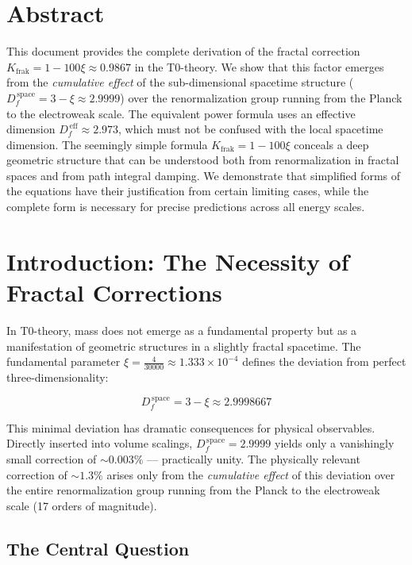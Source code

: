 \section*{Abstract}
		This document provides the complete derivation of the fractal correction $K_{\text{frak}} = 1 - 100\xi \approx 0.9867$ in the T0-theory. We show that this factor emerges from the \emph{cumulative effect} of the sub-dimensional spacetime structure ($D_f^{\,\text{space}} = 3 - \xi \approx 2.9999$) over the renormalization group running from the Planck to the electroweak scale. The equivalent power formula uses an effective dimension $D_f^{\,\text{eff}} \approx 2.973$, which must not be confused with the local spacetime dimension. The seemingly simple formula $K_{\text{frak}} = 1 - 100\xi$ conceals a deep geometric structure that can be understood both from renormalization in fractal spaces and from path integral damping. We demonstrate that simplified forms of the equations have their justification from certain limiting cases, while the complete form is necessary for precise predictions across all energy scales.

	
	
	\section{Introduction: The Necessity of Fractal Corrections}
	
	In T0-theory, mass does not emerge as a fundamental property but as a manifestation of geometric structures in a slightly fractal spacetime. The fundamental parameter $\xi = \frac{4}{30000} \approx 1.333 \times 10^{-4}$ defines the deviation from perfect three-dimensionality:
	
	\begin{equation}
		D_f^{\,\text{space}} = 3 - \xi \approx 2.9998667
		\label{eq:Df_def}
	\end{equation}
	
	This minimal deviation has dramatic consequences for physical observables. Directly inserted into volume scalings, $D_f^{\,\text{space}} = 2.9999$ yields only a vanishingly small correction of $\sim 0.003\%$ --- practically unity. The physically relevant correction of $\sim 1.3\%$ arises only from the \emph{cumulative effect} of this deviation over the entire renormalization group running from the Planck to the electroweak scale (17 orders of magnitude).
	
	\subsection{The Central Question}
	
